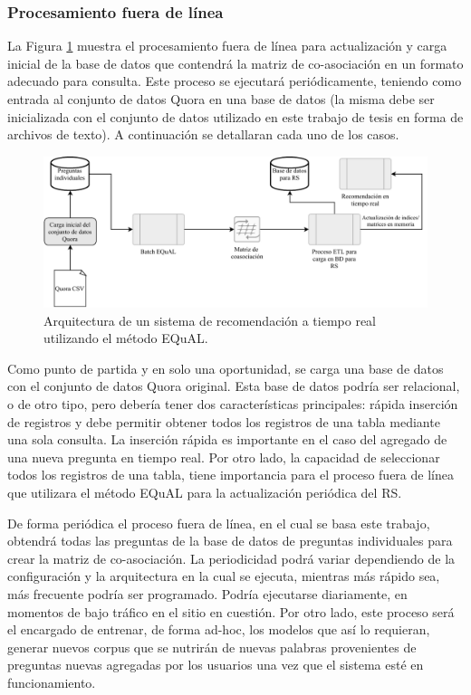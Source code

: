 \subsubsection{Procesamiento fuera de línea}
La Figura \ref{fig:implementacionrsbatch} muestra el procesamiento fuera de línea para actualización y carga inicial de la base de datos que contendrá la matriz de co-asociación en un formato adecuado para consulta. Este proceso se ejecutará periódicamente, teniendo como entrada al conjunto de datos Quora en una base de datos (la misma debe ser inicializada con el conjunto de datos utilizado en este trabajo de tesis en forma de archivos de texto). A continuación se detallaran cada uno de los casos.

\bigskip
\begin{figure}[h!]
	\centering
	\includegraphics[width=0.9\linewidth]{8_problema_investigacion/imagenes/implementacion_rs_batch}
	\caption{Arquitectura de un sistema de recomendación a tiempo real utilizando el método EQuAL.}
	\label{fig:implementacionrsbatch}
\end{figure}

Como punto de partida y en solo una oportunidad, se carga una base de datos con el conjunto de datos Quora original. Esta base de datos podría ser relacional, o de otro tipo, pero debería tener dos características principales: rápida inserción de registros y debe permitir obtener todos los registros de una tabla mediante una sola consulta. La inserción rápida es importante en el caso del agregado de una nueva pregunta en tiempo real. Por otro lado, la capacidad de seleccionar todos los registros de una tabla, tiene importancia para el proceso fuera de línea que utilizara el método EQuAL para la actualización periódica del RS.

\bigskip De forma periódica el proceso fuera de línea, en el cual se basa este trabajo, obtendrá todas las preguntas de la base de datos de preguntas individuales para crear la matriz de co-asociación. La periodicidad podrá variar dependiendo de la configuración y la arquitectura en la cual se ejecuta, mientras más rápido sea, más frecuente podría ser programado. Podría ejecutarse diariamente, en momentos de bajo tráfico en el sitio en cuestión. Por otro lado, este proceso será el encargado de entrenar, de forma ad-hoc, los modelos que así lo requieran, generar nuevos corpus que se nutrirán de nuevas palabras provenientes de preguntas nuevas agregadas por los usuarios una vez que el sistema esté en funcionamiento.

